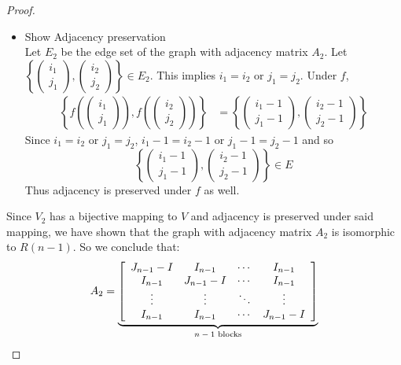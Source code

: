 \begin{proof}
\begin{itemize}
    \item Show Adjacency preservation\\
    Let $E_2$ be the edge set of the graph with adjacency matrix $A_2$. Let $\left\{\begin{pmatrix}i_1\\j_1\end{pmatrix},  \begin{pmatrix}i_2\\j_2\end{pmatrix}\right\}\in E_2$. This implies $i_1=i_2$ or $j_1=j_2$. Under $f$, 
    \begin{align*}
        \left\{f\left(\begin{pmatrix}i_1\\j_1\end{pmatrix}\right),  f\left(\begin{pmatrix}i_2\\j_2\end{pmatrix}\right)\right\}
        &= \left\{\begin{pmatrix}i_1-1\\j_1-1\end{pmatrix},  \begin{pmatrix}i_2-1\\j_2-1\end{pmatrix}\right\}
    \end{align*}
    Since $i_1=i_2$ or $j_1=j_2$, $i_1-1=i_2-1$ or $j_1-1=j_2-1$ and so
    \begin{equation*}
        \left\{\begin{pmatrix}i_1-1\\j_1-1\end{pmatrix},  \begin{pmatrix}i_2-1\\j_2-1\end{pmatrix}\right\} \in E
    \end{equation*}
    Thus adjacency is preserved under $f$ as well.
\end{itemize}
Since $V_2$ has a bijective mapping to $V$ and adjacency is preserved under said mapping, we have shown that the graph with adjacency matrix $A_2$ is isomorphic to $R(n-1)$. So we conclude that:
\begin{equation*}
    A_2 = 
        \underbrace{
        \left[
        \begin{array}{cccc}
        J_{n-1} - I & I_{n-1} & \cdots & I_{n-1} \\
        I_{n-1} & J_{n-1} - I & \cdots & I_{n-1} \\
        \vdots & \vdots & \ddots & \vdots \\
        I_{n-1} & I_{n-1} & \cdots & J_{n-1} - I
        \end{array}
        \right]
        }_{\text{\( n-1 \) blocks}}
\end{equation*}
\end{proof}

